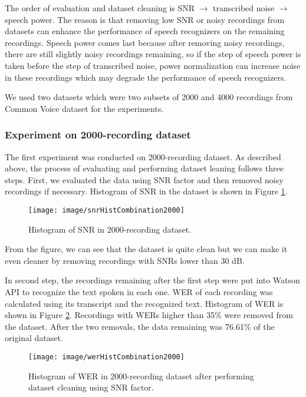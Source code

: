 \documentclass[12pt]{article}
\begin{document}
The order of evaluation and dataset cleaning is SNR $\rightarrow$ transcribed noise 	$\rightarrow$ speech power. The reason is that removing low SNR or noisy recordings from datasets can enhance the performance of speech recognizers on the remaining recordings. Speech power comes last because after removing noisy recordings, there are still slightly noisy recordings remaining, so if the step of speech power is taken before the step of transcribed noise, power normalization can increase noise in these recordings which may degrade the performance of speech recognizers.

We used two datasets which were two subsets of 2000 and 4000 recordings from Common Voice dataset for the experiments.

\subsubsection{Experiment on 2000-recording dataset}
The first experiment was conducted on 2000-recording dataset. As described above, the process of evaluating and performing dataset leaning follows three steps. First, we evaluated the data using SNR factor and then removed noisy recordings if necessary. Histogram of SNR in the dataset is shown in Figure \ref{fig_snrHistCombination2000}.
\begin{figure}[t]
\begin{center}
\texttt{[image: image/snrHistCombination2000]}
\end{center}
\vspace{-0.3cm}
\caption[Histogram of SNR in 2000-recording dataset.]{Histogram of SNR in 2000-recording dataset.}
\label{fig_snrHistCombination2000}
\end{figure}
From the figure, we can see that the dataset is quite clean but we can make it even cleaner by removing recordings with SNRs lower than 30 dB.

In second step, the recordings remaining after the first step were put into Watson API to recognize the text spoken in each one. WER of each recording was calculated using its transcript and the recognized text. Histogram of WER is shown in Figure \ref{fig_werHistCombination2000}. Recordings with WERs higher than 35\% were removed from the dataset. After the two removals, the data remaining was 76.61\% of the original dataset.

\begin{figure}[t]
\begin{center}
\texttt{[image: image/werHistCombination2000]}
\end{center}
\vspace{-0.3cm}
\caption[Histogram of WER in 2000-recording dataset after performing dataset cleaning using SNR factor.]{Histogram of WER in 2000-recording dataset after performing dataset cleaning using SNR factor.}
\label{fig_werHistCombination2000}
\end{figure}
\end{document}
